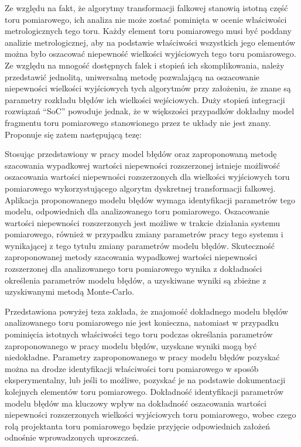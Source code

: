 Ze względu na fakt, że algorytmy transformacji falkowej stanowią istotną część toru pomiarowego, ich analiza nie może zostać pominięta w ocenie właściwości metrologicznych tego toru. Każdy element toru pomiarowego musi być poddany analizie metrologicznej, aby na podstawie właściwości wszystkich jego elementów można było oszacować niepewność wielkości wyjściowych tego toru pomiarowego. Ze względu na mnogość dostępnych falek i stopień ich skomplikowania, należy przedstawić jednolitą, uniwersalną metodę pozwalającą na oszacowanie niepewności wielkości wyjściowych tych algorytmów przy założeniu, że znane są parametry rozkładu błędów ich wielkości wejściowych. Duży stopień integracji rozwiązań \enquote{SoC} powoduje jednak, że w większości przypadków dokładny model fragmentu toru pomiarowego stanowionego przez te układy nie jest znany. Proponuje się zatem następującą tezę:

\begin{quoting}[font = bfseries]
Stosując przedstawiony w pracy model błędów oraz zaproponowaną metodę szacowania wypadkowej wartości niepewności rozszerzonej istnieje możliwość oszacowania wartości niepewności rozszerzonych dla wielkości wyjściowych toru pomiarowego wykorzystującego algorytm dyskretnej transformacji falkowej. Aplikacja proponowanego modelu błędów wymaga identyfikacji parametrów tego modelu, odpowiednich dla analizowanego toru pomiarowego. Oszacowanie wartości niepewności rozszerzonych jest możliwe w trakcie działania systemu pomiarowego, również w przypadku zmiany parametrów pracy tego systemu i wynikającej z tego tytułu zmiany parametrów modelu błędów. Skuteczność zaproponowanej metody szacowania wypadkowej wartości niepewności rozszerzonej dla analizowanego toru pomiarowego wynika z dokładności określenia parametrów modelu błędów, a uzyskiwane wyniki są zbieżne z uzyskiwanymi metodą Monte-Carlo.
\end{quoting}

Przedstawiona powyżej teza zakłada, że znajomość dokładnego modelu błędów analizowanego toru pomiarowego nie jest konieczna, natomiast w przypadku pominięcia istotnych właściwości tego toru podczas określania parametrów zaproponowanego w pracy modelu błędów, uzyskane wyniki mogą być niedokładne. Parametry zaproponowanego w pracy modelu błędów pozyskać można na drodze identyfikacji właściwości toru pomiarowego w sposób eksperymentalny, lub jeśli to możliwe, pozyskać je na podstawie dokumentacji kolejnych elementów toru pomiarowego. Dokładność identyfikacji parametrów modelu błędów ma kluczowy wpływ na dokładność oszacowania wartości niepewności rozszerzonych wielkości wyjściowych toru pomiarowego, wobec czego rolą projektanta toru pomiarowego będzie przyjęcie odpowiednich założeń odnośnie wprowadzonych uproszczeń.

